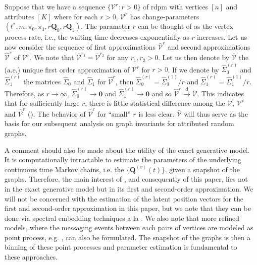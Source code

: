 \documentclass[10pt,draftclsnofoot,onecolumn]{IEEEtran}
\theoremstyle{definition}
\begin{document}
Suppose that we have a sequence $\{\mathscr{V}^{r} \colon r > 0 \}$ of
rdpm with vertices $[n]$ and attributes $[K]$ where for each $r > 0$,
$\mathscr{V}^{r}$ has change-parameters $(t^{*}, m, \pi_0, \pi_1, r
\mathbf{Q}_0, r \mathbf{Q}_1)$. The parameter $r$ can be thought of as
the vertex process rate, i.e., the waiting time decreases
exponentially as $r$ increases. Let us now consider the sequence of
first approximations $\bar{\mathscr{V}}^{r}$ and second approximations
$\widehat{\mathscr{V}}^{r}$ of $\mathscr{V}^{r}$. We note that
$\bar{\mathscr{V}}^{r_1} = \bar{\mathscr{V}}^{r_2}$ for any $r_1, r_2
> 0$. Let us then denote by $\bar{\mathscr{V}}$ the (a.e.) unique
first order approximation of $\mathscr{V}^{r}$ for $r > 0$. If we
denote by $\widehat{\Sigma}_{0}^{(r)}$ and
$\widehat{\Sigma}_{1}^{(r)}$ the matrices $\widehat{\Sigma}_0$ and
$\widehat{\Sigma}_1$ for $\widehat{\mathscr{V}}^{r}$, then
$\widehat{\Sigma}_0^{(r)} = \widehat{\Sigma}_0^{(1)}/r$ and
$\widehat{\Sigma}_{1}^{(r)} = \widehat{\Sigma}_1^{(1)}/r$. Therefore,
as $r \rightarrow \infty$, $\widehat{\Sigma}_0^{(r)} \rightarrow
\bm{0}$ and $\widehat{\Sigma}_1^{(r)} \rightarrow \bm{0}$ and so
$\widehat{\mathscr{V}}^{r} \overset{\mathrm{d}}{\longrightarrow}
\bar{\mathscr{V}}$. This indicates that for sufficiently large $r$,
there is little statistical difference among the
$\bar{\mathscr{V}}$, $\mathscr{V}^{r}$ and $\widehat{\mathscr{V}}^{r}$
(\cite[Theorem 2]{lee11}). The behavior of
$\widehat{\mathscr{V}}^{r}$ for ``small'' $r$ is less
clear. $\bar{\mathscr{V}}$ will thus serve as the basis for our
subsequent analysis on graph invariants for attributed random
graphs.

A comment should also be made about the utility of the exact
generative model. It is computationally intractable to estimate the
parameters of the underlying continuous time Markov chains, i.e. the
$\{\mathbf{Q}^{(v)}(t)\}$, given a snapshot of the graphs. Therefore,
the main interest of \cite{lee11}, and consequently of this paper,
lies not in the exact generative model but in its first and
second-order approximation. We will not be concerned with the
estimation of the latent position vectors for the first and
second-order approximation in this paper, but we note that they can be
done via spectral embedding techniques a la \cite{STFP-2011}. We also
note that more refined models, where the messaging events between each pairs of
vertices are modeled as point process,
e.g. \cite{Heard2010,PerryWolfe2010}, can also be formulated. The
snapshot of the graphs is then a binning of these point processes and
parameter estimation is fundamental to
these approaches.
\end{document}
